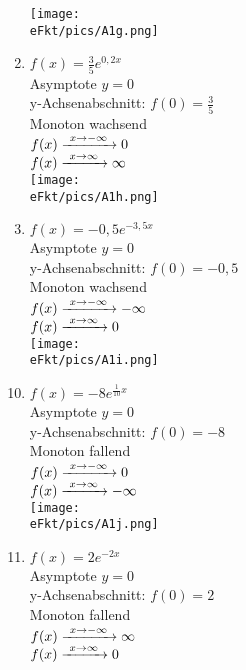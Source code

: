\begin{Answer}[ref=eFktA1]
\begin{minipage}{\textwidth}
\begin{minipage}[t]{0.49\textwidth}
\begin{enumerate}[label=\alph*)]
				\texttt{[image: \\eFkt/pics/A1g.png]}
				\item \(f(x)=\frac{3}{5}e^{0,2x}\)\\
				Asymptote \(y=0\)\\
				y-Achsenabschnitt: \(f(0)=\frac{3}{5}\)\\
				Monoton wachsend\\
				\(f(x)\xrightarrow{\hphantom{\ }x\to-\infty\hphantom{\ }}0\)\\
				\(f(x)\xrightarrow{\hphantom{\ }x\to\infty\hphantom{\ }}\infty\)\\
				\texttt{[image: \\eFkt/pics/A1h.png]}
				\item \(f(x)=-0,5e^{-3,5x}\)\\
				Asymptote \(y=0\)\\
				y-Achsenabschnitt: \(f(0)=-0,5\)\\
				Monoton wachsend\\
				\(f(x)\xrightarrow{\hphantom{\ }x\to-\infty\hphantom{\ }}-\infty\)\\
				\(f(x)\xrightarrow{\hphantom{\ }x\to\infty\hphantom{\ }}0\)\\
				\texttt{[image: \\eFkt/pics/A1i.png]}
			\end{enumerate}
		\end{minipage}
		\begin{minipage}[t]{0.49\textwidth}
			\begin{enumerate}[label=\alph*)]
				\setcounter{enumi}{9}
				\item \(f(x)=-8e^{\frac{1}{10}x}\)\\
				Asymptote \(y=0\)\\
				y-Achsenabschnitt: \(f(0)=-8\)\\
				Monoton fallend\\
				\(f(x)\xrightarrow{\hphantom{\ }x\to-\infty\hphantom{\ }}0\)\\
				\(f(x)\xrightarrow{\hphantom{\ }x\to\infty\hphantom{\ }}-\infty\)\\
				\texttt{[image: \\eFkt/pics/A1j.png]}
				\item \(f(x)=2e^{-2x}\)\\
				Asymptote \(y=0\)\\
				y-Achsenabschnitt: \(f(0)=2\)\\
				Monoton fallend\\
				\(f(x)\xrightarrow{\hphantom{\ }x\to-\infty\hphantom{\ }}\infty\)\\
				\(f(x)\xrightarrow{\hphantom{\ }x\to\infty\hphantom{\ }}0\)\\

\end{enumerate}
\end{minipage}
\end{minipage}
\end{Answer}
